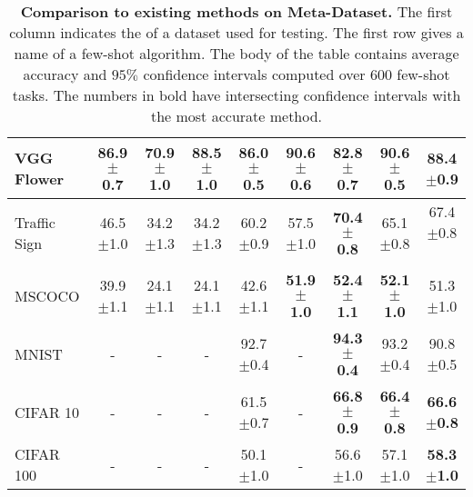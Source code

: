 \documentclass[runningheads]{llncs}
\newcommand\bb[1]{\textbf{#1}}
\newcommand{\pms}[1]{{\scriptsize $\pm$#1}}
\begin{document}
\begin{table}[t!]
\begin{center}
{\begin{tabular}{l| c c c c c c c c}
VGG Flower   &   86.9\pms{0.7} &  70.9\pms{1.0} &  88.5\pms{1.0} &       86.0\pms{0.5} &    \bb{90.6\pms{0.6}} &  82.8\pms{0.7}       &  \bb{90.6\pms{0.5}} &      88.4\pms{0.9}        \\
\hline                         
Traffic Sign &   46.5\pms{1.0} &  34.2\pms{1.3} &  34.2\pms{1.3} &       60.2\pms{0.9} &         57.5\pms{1.0} &  \bb{70.4\pms{0.8}}  &  65.1\pms{0.8}      &  67.4\pms{0.8}    \   \\
MSCOCO       &   39.9\pms{1.1} &  24.1\pms{1.1} &  24.1\pms{1.1} &       42.6\pms{1.1} &    \bb{51.9\pms{1.0}} &  \bb{52.4\pms{1.1}}  &  \bb{52.1\pms{1.0}} &      51.3\pms{1.0}    \\
MNIST        &               - &              - &              - &       92.7\pms{0.4} &                     - &  \bb{94.3\pms{0.4}}  &  93.2\pms{0.4}      &  90.8\pms{0.5}        \\
CIFAR 10     &               - &              - &              - &       61.5\pms{0.7} &                     - &  \bb{66.8\pms{0.9}}  &  \bb{66.4\pms{0.8}} &  \bb{66.6\pms{0.8}}   \\
CIFAR 100    &               - &              - &              - &       50.1\pms{1.0} &                     - &      56.6\pms{1.0}   &      57.1\pms{1.0}  &  \bb{58.3\pms{1.0}}   \\

\end{tabular}
}
\end{center}
\caption{\bb{Comparison to existing methods on Meta-Dataset.} The first column
  indicates the of a dataset used for testing. The first row gives a name
  of a few-shot algorithm. The body of the table contains average accuracy and
  $95\%$ confidence intervals computed over 600 few-shot tasks.  The numbers in
  bold have intersecting confidence intervals with the most accurate method.}
\label{tab:metadataset}
\end{table}
\end{document}
